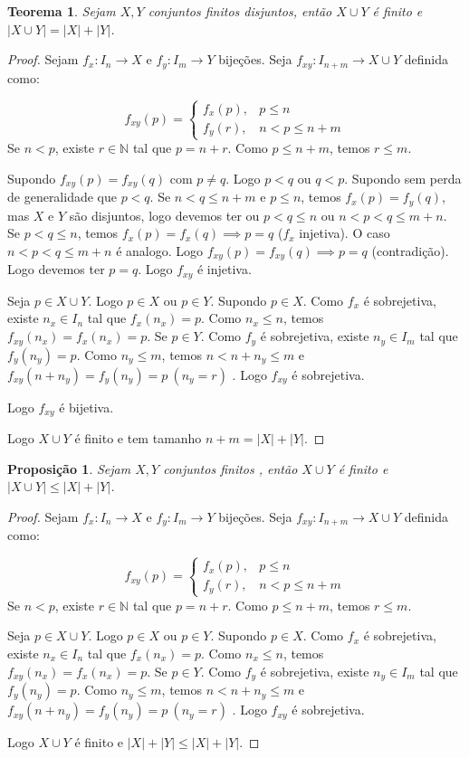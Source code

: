 \documentclass{article}
\theoremstyle{plain}
\newtheorem{prop}{Proposição}[section]
\newtheorem{teo}{Teorema}
\theoremstyle{definition}
\theoremstyle{remark}
\begin{document}
\begin{teo}
	Sejam $X,Y$ conjuntos finitos disjuntos, então $X\cup Y$ é finito e $|X\cup Y| = |X| + |Y|$.
\end{teo}
\begin{proof}
	Sejam $f_x : I_n \to X$ e $f_y : I_m \to Y$ bijeções.
	Seja $f_{xy}: I_{n+m} \to X\cup Y$ definida como: 

	$$ f_{xy}(p) = \begin{cases} f_x(p), & p\leq n \\ f_y(r), &n <  p \leq n+m    \end{cases} $$
	Se $n <p$, existe $r \in \mathbb{N}$ tal que $p = n+r$. Como $p \leq n+m$, temos $r \leq m$.

	Supondo $f_{xy}(p) = f_{xy}(q)$ com $p\neq q$. Logo $p<q$ ou $q<p$. Supondo sem perda de generalidade que $p<q$. Se $n < q \leq n+m$ e $p \leq n$, temos $f_x(p) = f_y(q)$, mas $X$ e $Y$ são disjuntos, logo  devemos ter ou $p < q \leq n$  ou $n < p < q \leq m+n$. Se $ p < q \leq n$, temos $f_x(p) = f_x(q) \implies p = q$ ($f_x$ injetiva). O caso $ n < p < q \leq m+n$ é analogo. Logo $f_{xy}(p) = f_{xy}(q) \implies p = q$ (contradição). Logo devemos ter  $p = q$. Logo $f_{xy}$ é injetiva.

	Seja $p\in X\cup Y$. Logo $p\in X$ ou $p\in Y$. Supondo $p\in X$. Como $f_x$ é sobrejetiva, existe $n_x \in I_n$ tal que $f_x(n_x) = p$. Como $n_x\leq n$, temos $f_{xy}(n_x) = f_x(n_x) = p$.  Se  $p\in Y$. Como $f_y$ é sobrejetiva, existe $n_y \in I_m$ tal que $f_y(n_y) = p$. Como $n_y\leq m$, temos $ n < n+n_y \leq m $  e $f_{xy}(n+n_y) = f_y(n_y) = p \: (n_y = r)$ . Logo $f_{xy}$ é sobrejetiva.
	
	Logo $f_{xy}$ é bijetiva.

	Logo $X\cup Y$ é finito e tem tamanho $n+m = |X| + |Y|$.


	
\end{proof}
\begin{prop}
	Sejam $X,Y$ conjuntos finitos , então $X\cup Y$ é finito e $|X\cup Y| \leq |X| + |Y|$.
\end{prop}
\begin{proof}
	Sejam $f_x : I_n \to X$ e $f_y : I_m \to Y$ bijeções.
	Seja $f_{xy}: I_{n+m} \to X\cup Y$ definida como: 

	$$ f_{xy}(p) = \begin{cases} f_x(p), & p\leq n \\ f_y(r), &n <  p \leq n+m    \end{cases} $$
	Se $n <p$, existe $r \in \mathbb{N}$ tal que $p = n+r$. Como $p \leq n+m$, temos $r \leq m$.


	Seja $p\in X\cup Y$. Logo $p\in X$ ou $p\in Y$. Supondo $p\in X$. Como $f_x$ é sobrejetiva, existe $n_x \in I_n$ tal que $f_x(n_x) = p$. Como $n_x\leq n$, temos $f_{xy}(n_x) = f_x(n_x) = p$.  Se  $p\in Y$. Como $f_y$ é sobrejetiva, existe $n_y \in I_m$ tal que $f_y(n_y) = p$. Como $n_y\leq m$, temos $ n < n+n_y \leq m $  e $f_{xy}(n+n_y) = f_y(n_y) = p \: (n_y = r)$ . Logo $f_{xy}$ é sobrejetiva.
	

	Logo $X\cup Y$ é finito e $|X| + |Y| \leq |X| + |Y|$.

\end{proof}
\end{document}

